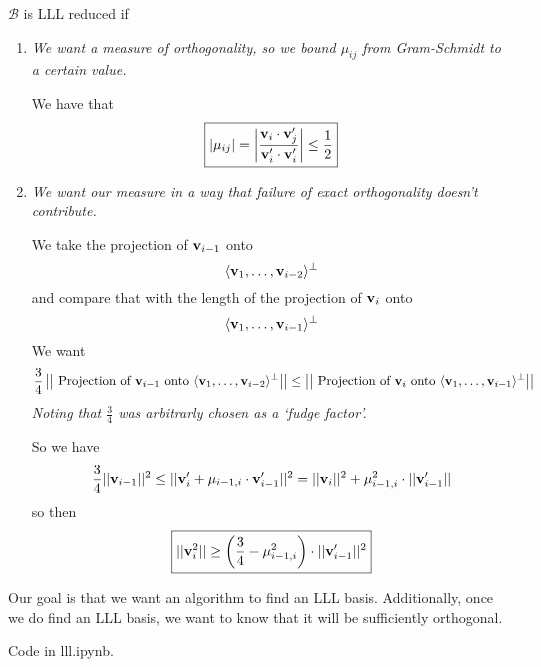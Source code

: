 \begin{definition}
    $\mathcal{B}$ is LLL reduced if
    \begin{enumerate}
        \item \emph{We want a measure of orthogonality, so we bound $\mu_{ij}$ from Gram-Schmidt to a certain value. }

              We have that
              \[\boxed{|\mu_{ij}| = \left\lvert\frac{\mathbf{v}_i\cdot \mathbf{v}_j'}{\mathbf{v}_i'\cdot\mathbf{v}_i'}\right\rvert\leq \frac{1}{2}}\]
        \item \emph{We want our measure in a way that failure of exact orthogonality doesn't contribute.}

              We take the projection of $\mathbf{v}_{i-1}$ onto
              \[\langle\mathbf{v}_1, \dots, \mathbf{v}_{i-2}\rangle^\perp\]
              and compare that with the length of the projection of $\mathbf{v}_i$ onto
              \[\langle\mathbf{v}_1, \dots, \mathbf{v}_{i-1}\rangle^\perp\]
              We want
                  {\small
                      \[\frac{3}{4}\left|\left|\ \text{Projection of $\bvec{v}_{i-1}$ onto } \langle\bvec{v}_1, \dots, \bvec{v}_{i-2}\rangle^\perp\right|\right|\leq \left|\left|\ \text{Projection of $\bvec{v}_{i}$ onto } \langle\bvec{v}_1, \dots, \bvec{v}_{i-1}\rangle^\perp\right|\right|\]
                  }
              \emph{Noting that $\frac{3}{4}$ was arbitrarly chosen as a `fudge factor'.}

              So we have
              \[\frac{3}{4}||\mathbf{v}_{i-1}||^2\leq ||\mathbf{v}_i' + \mu_{i-1, i}\cdot\mathbf{v}_{i-1}'||^2 = ||\mathbf{v}_i||^2 + \mu_{i-1, i}^2\cdot||\mathbf{v}_{i-1}'||\]
              so then
              \[\boxed{||\mathbf{v}_i^2||\geq\left( \frac{3}{4} - \mu_{i-1, i}^2 \right)\cdot ||\mathbf{v}_{i-1}'||^2}\]
    \end{enumerate}
\end{definition}

Our goal is that we want an algorithm to find an LLL basis. Additionally, once we do find an LLL basis, we want to know that it will be sufficiently orthogonal.

Code in \textsf{lll.ipynb}.